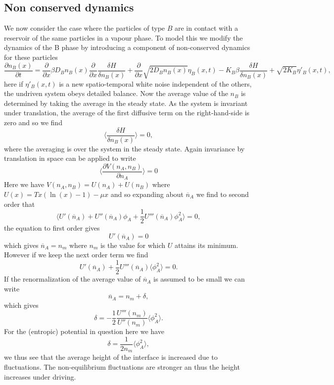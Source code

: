     \subsection{Non conserved dynamics}
We now consider the case where the particles of type $B$ are in contact with 
a reservoir of the same particles in a vapour phase. To model this we modify the dynamics of the B phase by introducing a component of non-conserved dynamics for these particles
\begin{equation}
\frac{\partial n_B(x)}{\partial t} = \frac{\partial}{\partial x} \beta D_B n_B(x)\frac{\partial}{\partial x} \frac{\delta H}{\delta n_B(x)} + \frac{\partial}{\partial x} \sqrt{2D_Bn_B(x)} \eta_B(x,t)
-K_B\beta \frac{\delta H}{\delta n_B(x)} + \sqrt{2K_B}\eta'_B(x,t),
\end{equation}
here if $\eta'_B(x,t)$ is a new spatio-temporal white noise independent of the 
others, the undriven system obeys detailed balance.  Now the average value of the $n_B$ is determined by taking the average in the steady state. As the system is invariant under translation, the average of the first diffusive term on the right-hand-side is zero and so we find
\begin{equation}
\langle \frac{\delta H}{\delta n_B(x)}\rangle=0,
\end{equation}
where the averaging is over the system in the steady state. Again invariance by translation in space can be applied to write
\begin{equation}
\langle \frac{\partial V(n_A,n_B)}{\partial n_A}\rangle  =0
\end{equation}
Here we have $V(n_A,n_B)= U(n_A) + U(n_B)$ where $U(x) = Tx(\ln(x)-1)-\mu x$ and so expanding about $\overline n_A$ we find to second order that 
\begin{equation}
\langle U'(\overline n_A) + U''(\overline n_A)\phi_A +\frac{1}{2}U'''(\overline n_A)\phi_A ^2 \rangle =0,
\end{equation}
the equation to first order gives 
\begin{equation}
U'(\overline n_A)=0
\end{equation}
which gives $\overline n_A= n_m$ where $n_m$ is the value for which $U$ attains its minimum. However if we keep the next order term we find 
\begin{equation}
U'(\overline n_A)+\frac{1}{2} U'''(\overline n_A)\langle\phi_A ^2 \rangle=0.
\end{equation}
If the renormalization of the average value of $\overline n_A$ is assumed to be small we can write
\begin{equation}
\overline n_A= n_m +\delta,
\end{equation}
which gives
\begin{equation}
\delta = -\frac{1}{2} \frac{U'''(n_m)}{U''(n_m)}\langle\phi_A ^2 \rangle.
\end{equation}
For the (entropic) potential in question here we have
\begin{equation}
\delta = \frac{1}{2n_m} \langle\phi_A ^2 \rangle,
\end{equation}
we thus see that the average height of the interface is increased due to fluctuations. The non-equilibrium fluctuations are stronger an thus the height increases under driving. 

              
              
              


